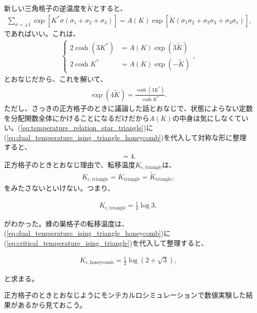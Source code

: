 \documentclass[paper=b5j,fontsize=12Q,jafontsize=12Q,baselineskip=21Q]{jlreq}
\begin{document}
\begin{refsection}
新しい三角格子の逆温度を$\tilde K$とすると、
\begin{align}
  \sum_{\sigma=\pm1}\exp[K^\ast\sigma(\sigma_1+\sigma_2+\sigma_3)]=A(K)\exp[\tilde K(\sigma_1\sigma_2+\sigma_2\sigma_3+\sigma_3\sigma_1)],\label{eq:star-triangle_eq}
\end{align}
であればいい。これは、
\begin{align}
  \begin{cases}
    2\cosh(3K^\ast)&=A(K)\exp(3\tilde K)\\
    2\cosh K^\ast&=A(K)\exp(-\tilde K)
  \end{cases},
\end{align}
とおなじだから、これを解いて、
\begin{align}
  \exp(4\tilde K)=\frac{\cosh(3K^\ast)}{\cosh K^\ast}.\label{eq:temperature_relation_star_triangle}
\end{align}
ただし、さっきの正方格子のときに議論した話とおなじで、状態によらない定数を分配関数全体にかけることになるだけだから$A(K)$の中身は気にしなくていい。(\ref{eq:temperature_relation_star_triangle})に(\ref{eq:dual_temperature_ising_triangle_honeycomb})を代入して対称な形に整理すると、
\begin{align}
  [\exp(4K_{\mathrm{triangle}})-1][\exp(4\tilde K_{\mathrm{triangle}})-1]=4.
\end{align}
正方格子のときとおなじ理由で、転移温度$K_{\mathrm{c,triangle}}$は、
\begin{align}
  K_{\mathrm{c,triangle}}=K_{\mathrm{triangle}}=\tilde K_{\mathrm{triangle}},
\end{align}
をみたさないといけない。つまり、
\begin{tcolorbox}
\begin{align}
  K_{\mathrm{c,triangle}}=\frac14\log3,\label{eq:critical_temperature_ising_triangle}
\end{align}
\end{tcolorbox}
がわかった。蜂の巣格子の転移温度は、(\ref{eq:dual_temperature_ising_triangle_honeycomb})に(\ref{eq:critical_temperature_ising_triangle})を代入して整理すると、
\begin{tcolorbox}
\begin{align}
  K_{\mathrm{c,honeycomb}}=\frac12\log\left(2+\sqrt 3\right),\label{eq:critical_temperature_ising_honeycomb}
\end{align}
\end{tcolorbox}
と求まる。

正方格子のときとおなじようにモンテカルロシミュレーションで数値実験した結果があるから見ておこう。


\end{refsection}
\end{document}
